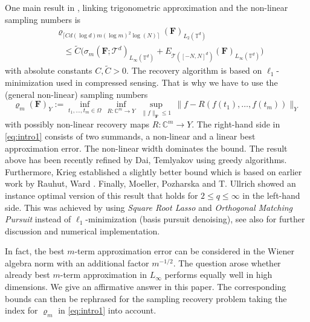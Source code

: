 \documentclass[11pt,reqno]{article}
\numberwithin{equation}{section}
\theoremstyle{definition}
\theoremstyle{plain}
\newcommand{\tor}{\ensuremath{\mathbb{T}}}
\begin{document}
One main result in \cite[Thm.\ 3.1]{JUV23}, linking trigonometric approximation and the non-linear sampling numbers is
\begin{equation}\label{eq:intro1}
  \begin{split}
     &\varrho_{\lceil Cd (\log{d}) m (\log{m})^2\log(N)\rceil } (\mathbf{F})_{L_2(\tor^d)}\\ 
     &~~~~\leq \widetilde{C}
           \big(\sigma_m(\mathbf{F};\mathcal{T}^d)_{L_\infty(\tor^d)}
                   + E_{\mathcal{T}([-N,N]^d)}(\mathbf{F})_{L_\infty(\tor^d)}
                 \big)\,
	\end{split}
\end{equation}
with absolute constants $C, \widetilde{C}>0$. The recovery algorithm is based on $\ell_1$-minimization used in compressed sensing. That is why we have to use the (general non-linear) sampling numbers
\begin{equation*}
  \varrho_m (\mathbf{F})_Y
  := \inf_{t_1,\ldots,t_m \in \Omega}\,
       \inf_{R : \mathbb{C}^m \to Y}\,
         \sup_{\|f\|_{\mathbf{F}} \leq 1}\,
           \|f - R(f(t_1),\ldots,f(t_m))\|_Y\,
\end{equation*}
with possibly non-linear recovery maps $R:\mathbb{C}^m \to Y$. The right-hand side in \eqref{eq:intro1} consists of two summands, a non-linear and a linear best approximation error. The non-linear width dominates the bound. The result above has been recently refined  by Dai, Temlyakov \cite{DaTe24}  using  greedy algorithms. Furthermore, Krieg \cite{Kr23} established a slightly better bound which is based on earlier work by Rauhut, Ward \cite{RaWa16}. Finally, Moeller, Pozharska and T. Ullrich \cite[Theorem 3]{MPU25_1} showed an instance optimal version of this result that holds for \(2 \leq q  \leq \infty\) in the left-hand side. This was achieved by using \emph{Square Root Lasso} and \emph{Orthogonal Matching Pursuit} instead of $\ell_1$-minimization (basis pursuit denoising), see also \cite[Section 5]{MNPSU26} for further discussion and numerical implementation.

In fact, the best $m$-term approximation error can be considered in the Wiener algebra norm with an additional factor $m^{-1/2}$. The question arose whether already best $m$-term approximation in $L_\infty$ performs equally well in high dimensions. We give an affirmative answer in this paper. The corresponding bounds can then be rephrased for the sampling recovery problem taking the index for $\varrho_m$ in \eqref{eq:intro1} into account. 
\end{document}
